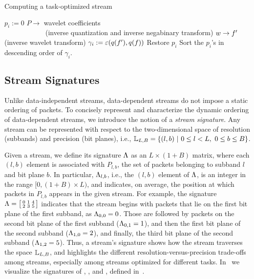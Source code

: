 \begin{algorithm}[h]
  \caption{Computing a task-optimized stream}
  \begin{algorithmic}[1]
			\State $p_i := 0$
      \State $P \rightarrow$ wavelet coefficients \wcof \\
      		\ \ \ \ \ \ \ \ \ \ \ \ (inverse quantization and inverse negabinary transform)
			\State $\wcof \rightarrow f'$ (inverse wavelet transform)
			\State $\gamma_i := \err(q(f'),q(f))$			
			\State Restore $p_i$
		\EndFor
		\State Sort the $p_i$'s in descending order of $\gamma_i$.
	\end{algorithmic}
	\label{alg:greedy}
\end{algorithm}

\subsection{Stream Signatures} \label{sec:stream-signature}

Unlike data-independent streams, data-dependent streams do not impose a static ordering of packets.
To concisely represent and characterize the dynamic ordering of data-dependent streams, we introduce
the notion of a \emph{stream signature}. Any stream can be represented with respect to the
two-dimensional space of resolution (subbands) and precision (bit
planes), i.e., \mbox{${\mathbb L}_{L,B}=\{(l,b)\ |\ 0\leq l < L,\ 0\leq b \leq B\}$.}

Given a stream, we define its signature $\sgn$ as an $L \times (1+B)$ matrix, where each $(l,b)$
element is associated with $P_{l,b}$, the set of packets belonging to subband $l$ and bit plane
$b$. In particular, $\sgn_{l,b}$, i.e., the $(l,b)$ element of $\sgn$, is an integer in the range
$[0, (1+B)\times L)$, and indicates, on average, the position at which packets in $P_{l,b}$ appears
in the given stream. For example, the signature $\sgn=\bigl[ \begin{smallmatrix}0 & 1 & 4\\
2 & 3 & 5\end{smallmatrix}\bigr]$ indicates that the stream begins with packets that lie on the
first bit plane of the first subband, as $\sgn_{0,0}=0$. Those are followed by packets on the second
bit plane of the first subband ($\sgn_{0,1}=1$), and then the first bit plane of the second subband
($\sgn_{1,0}=2$), and finally, the third bit plane of the second subband ($\sgn_{1,2}=5$). Thus, a
stream's signature shows how the stream traverses the space ${\mathbb L}_{L,B}$, and highlights the
different resolution-versus-precision trade-offs among streams, especially among \sopt streams
optimized for different tasks. In~ we visualize the signatures of
\sbit, \slvl, and \swav, defined in~.

